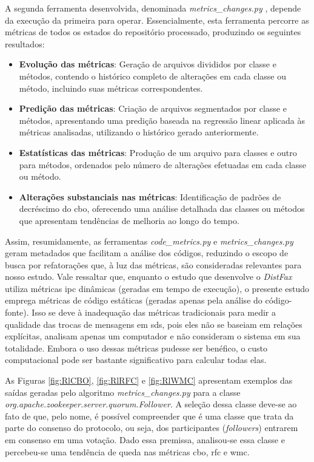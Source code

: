 A segunda ferramenta desenvolvida, denominada \textit{metrics\_changes.py} \cite{PyDriller:MetricsChanges:2023},  depende da execução da primeira para operar. Essencialmente, esta ferramenta percorre as métricas de todos os estados do repositório processado, produzindo os seguintes resultados:

\begin{itemize}
    \item \textbf{Evolução das métricas}: Geração de arquivos divididos por classe e métodos, contendo o histórico completo de alterações em cada classe ou método, incluindo suas métricas correspondentes.
    \item \textbf{Predição das métricas}: Criação de arquivos segmentados por classe e métodos, apresentando uma predição baseada na regressão linear aplicada às métricas analisadas, utilizando o histórico gerado anteriormente.
    \item \textbf{Estatísticas das métricas}: Produção de um arquivo para classes e outro para métodos, ordenados pelo número de alterações efetuadas em cada classe ou método.
    \item \textbf{Alterações substanciais nas métricas}: Identificação de padrões de decréscimo do \gls{cbo}, oferecendo uma análise detalhada das classes ou métodos que apresentam tendências de melhoria ao longo do tempo.
\end{itemize}

Assim, resumidamente, as ferramentas \textit{code\_metrics.py} e \textit{metrics\_changes.py} geram metadados que facilitam a análise dos códigos, reduzindo o escopo de busca por refatorações que, à luz das métricas, são consideradas relevantes para nosso estudo. Vale ressaltar que, enquanto o estudo que desenvolve o \textit{DistFax} \cite{DistFax} utiliza métricas \gls{ipc} dinâmicas (geradas em tempo de execução), o presente estudo emprega métricas de código estáticas (geradas apenas pela análise do código-fonte). Isso se deve à inadequação das métricas tradicionais para medir a qualidade das trocas de mensagens em \gls{sds}, pois eles não se baseiam em relações explícitas, analisam apenas um computador e não consideram o sistema em sua totalidade. Embora o uso dessas métricas pudesse ser benéfico, o custo computacional pode ser bastante significativo para calcular todas elas.

As Figuras \ref{fig:RlCBO}, \ref{fig:RlRFC} e \ref{fig:RlWMC} apresentam exemplos das saídas geradas pelo algoritmo \textit{metrics\_changes.py} para a classe \textit{org.apache.zookeeper.server.quorum.Follower}. A seleção dessa classe deve-se ao fato de que, pelo nome, é possível compreender que é uma classe que trata da parte do consenso do protocolo, ou seja, dos participantes (\textit{followers}) entrarem em consenso em uma votação. Dado essa premissa, analisou-se essa classe e percebeu-se uma tendência de queda nas métricas \gls{cbo}, \gls{rfc} e \gls{wmc}.

